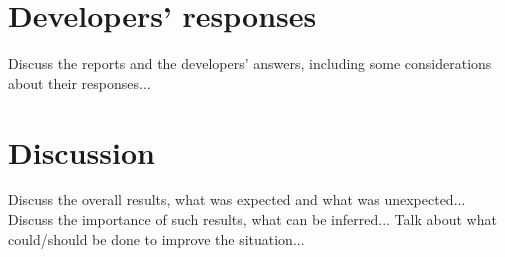 


\newpage
\section{Developers' responses}
Discuss the reports and the developers' answers, including some considerations about their responses...


\newpage
\section{Discussion}
Discuss the overall results, what was expected and what was unexpected...
\newline \newline
Discuss the importance of such results, what can be inferred...
\newline \newline
Talk about what could/should be done to improve the situation...
